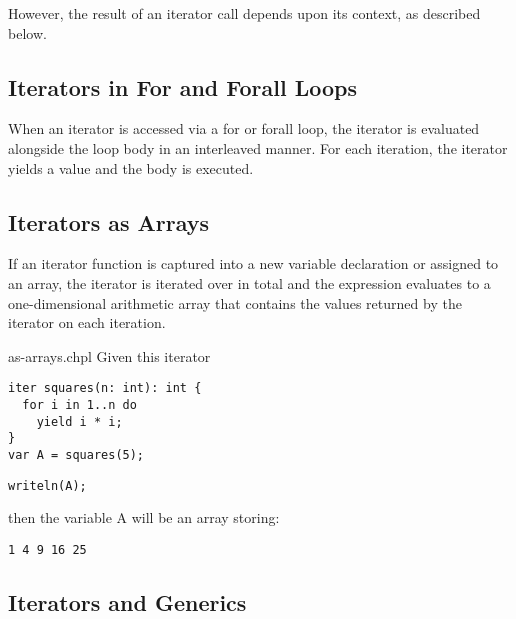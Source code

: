 However, the result of an iterator call depends upon its context, as described below.

\subsection{Iterators in For and Forall Loops}
\label{Iterators_in_For_and_Forall_Loops}

When an iterator is accessed via a for or forall loop, the iterator is
evaluated alongside the loop body in an interleaved manner.  For each
iteration, the iterator yields a value and the body is executed.

\subsection{Iterators as Arrays}
\label{Iterators_as_Arrays}

If an iterator function is captured into a new variable declaration or
assigned to an array, the iterator is iterated over in total and the
expression evaluates to a one-dimensional arithmetic array that
contains the values returned by the iterator on each iteration.
\begin{chapelexample}{as-arrays.chpl}
Given this iterator
\begin{chapel}
\begin{verbatim}
iter squares(n: int): int {
  for i in 1..n do
    yield i * i;
}
var A = squares(5);
\end{verbatim}
\end{chapel}
\begin{chapelpost}
\begin{verbatim}
writeln(A);
\end{verbatim}
\end{chapelpost}
then the variable A will be an array storing:
\begin{chapelprintoutput}
\begin{verbatim}
1 4 9 16 25
\end{verbatim}
\end{chapelprintoutput}
\end{chapelexample}

\subsection{Iterators and Generics}
\label{Iterators_and_Generics}


